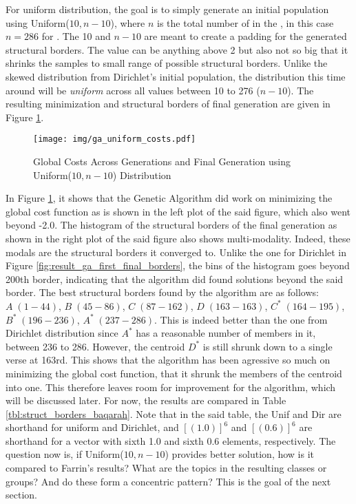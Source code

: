For uniform distribution, the goal is to simply generate an initial population using Uniform($10,n-10$), where $n$ is the total number of   in the  , in this case $n=286$ for  . The 10 and $n-10$ are meant to create a padding for the generated structural borders. The value can be anything above 2 but also not so big that it shrinks the samples to small range of possible structural borders. Unlike the skewed distribution from Dirichlet's initial population, the distribution this time around will be \textit{uniform} across all values between 10 to 276 ($n-10$). The resulting minimization and structural borders of final generation are given in Figure \ref{fig:result_ga_uniform}. 

\begin{figure}[!t]
    \centering
    \texttt{[image: img/ga\_uniform\_costs.pdf]}
    \caption{Global Costs Across Generations and Final Generation using Uniform($10,n-10$) Distribution}
    \label{fig:result_ga_uniform}
\end{figure}

In Figure \ref{fig:result_ga_uniform}, it shows that the Genetic Algorithm did work on minimizing the global cost function as is shown in the left plot of the said figure, which also went beyond -2.0. The histogram of the structural borders of the final generation as shown in the right plot of the said figure also shows multi-modality. Indeed, these modals are the structural borders it converged to. Unlike the one for Dirichlet in Figure \ref{fig:result_ga_first_final_borders}, the bins of the histogram goes beyond 200th border, indicating that the algorithm did found solutions beyond the said border. The best structural borders found by the algorithm are as follows: $A\;(1-44)$, $B\;(45-86)$, $C\;(87-162)$, $D\;(163-163)$, $C^*\;(164-195)$, $B^*\;(196-236)$, $A^*\;(237-286)$. This is indeed better than the one from Dirichlet distribution since $A^*$ has a reasonable number of members in it, between   236 to 286. However, the centroid $D^*$ is still shrunk down to a single verse at 163rd. This shows that the algorithm has been agressive so much on minimizing the global cost function, that it shrunk the members of the centroid into one. This therefore leaves room for improvement for the algorithm, which will be discussed later. For now, the results are compared in Table \ref{tbl:struct_borders_baqarah}. Note that in the said table, the Unif and Dir are shorthand for uniform and Dirichlet, and $[(1.0)]^6$ and $[(0.6)]^6$ are shorthand for a vector with sixth 1.0 and sixth 0.6 elements, respectively. The question now is, if Uniform($10,n-10$) provides better solution, how is it compared to Farrin's results? What are the topics in the resulting classes or groups? And do these form a concentric pattern? This is the goal of the next section.

